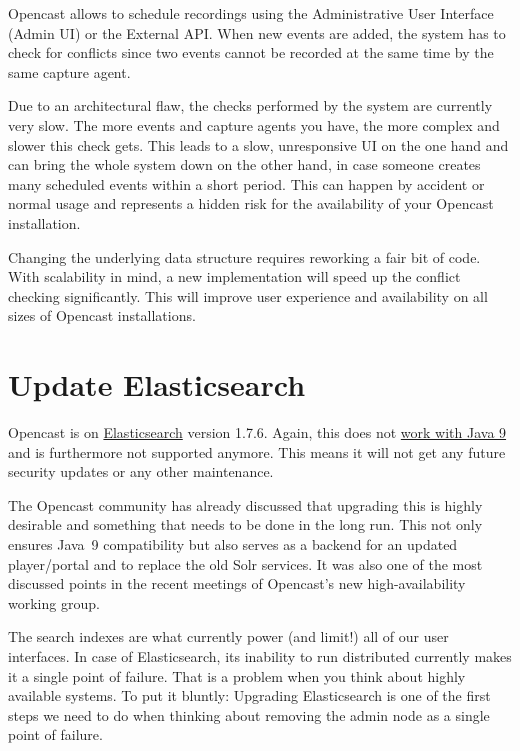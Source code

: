 \documentclass[a4paper]{article}
\begin{document}
Opencast allows to schedule recordings using the Administrative User Interface
(Admin UI) or the External API. When new events are added, the system has to
check for conflicts since two events cannot be recorded at the same time by the
same capture agent.

Due to an architectural flaw, the checks performed by the system are
currently very slow. The more events and capture agents you have, the
more complex and slower this check gets. This leads to a slow,
unresponsive UI on the one hand and can bring the whole system down on
the other hand, in case someone creates many scheduled events within a
short period. This can happen by accident or normal usage and
represents a hidden risk for the availability of your Opencast
installation.

Changing the underlying data structure requires reworking a fair bit of
code. With scalability in mind, a new implementation will speed up the
conflict checking significantly. This will improve user experience and
availability on all sizes of Opencast installations.


\section*{Update Elasticsearch}

Opencast is on
\href{https://www.elastic.co/products/elasticsearch}{Elasticsearch} version
1.7.6. Again, this does not
\href{https://www.elastic.co/support/matrix#matrix_jvm}{work with Java 9} and
is furthermore not supported anymore. This means it will not get any future
security updates or any other maintenance.

The Opencast community has already discussed that upgrading
this is highly desirable and something that needs to be done in the
long run. This not only ensures Java~9 compatibility but also serves as a
backend for an updated player/portal and to replace the old Solr
services. It was also one of the most discussed points in the recent
meetings of Opencast's new high-availability working group.

The search indexes are what currently power (and limit!) all of our
user interfaces. In case of Elasticsearch, its inability to run
distributed currently makes it a single point of failure. That is a
problem when you think about highly available systems. To put it
bluntly: Upgrading Elasticsearch is one of the first steps we need to
do when thinking about removing the admin node as a single point of
failure.
\end{document}

